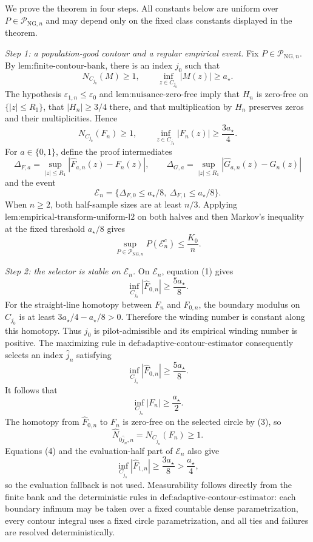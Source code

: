 We prove the theorem in four steps.  All constants below are uniform over
\(P\in\mathcal P_{\mathrm{NG},n}\) and may depend only on the fixed class
constants displayed in the theorem.

\emph{Step 1: a population-good contour and a regular empirical event.}
Fix \(P\in\mathcal P_{\mathrm{NG},n}\).  By
\(\text{lem:finite-contour-bank}\), there is an index \(j_0\) such that
\[
 N_{C_{j_0}}(M)\ge1,
 \qquad
 \inf_{z\in C_{j_0}}|M(z)|\ge a_{\star}.
\]
The hypothesis \(\varepsilon_{1,n}\le\varepsilon_0\) and
\(\text{lem:nuisance-zero-free}\) imply that \(H_n\) is zero-free on
\(\{|z|\le R_1\}\), that \(|H_n|\ge3/4\) there, and that multiplication
by \(H_n\) preserves zeros and their multiplicities.  Hence
\[
 N_{C_{j_0}}(F_n)\ge1,
 \qquad
 \inf_{z\in C_{j_0}}|F_n(z)|\ge\frac{3a_{\star}}4.       \tag{1}
\]
For \(a\in\{0,1\}\), define the proof intermediates
\[
 \Delta_{F,a}=\sup_{|z|\le R_1}
   |\widehat F_{a,n}(z)-F_n(z)|,
 \qquad
 \Delta_{G,a}=\sup_{|z|\le R_1}
   |\widehat G_{a,n}(z)-G_n(z)|
\]
and the event
\[
 \mathcal E_n=
 \{\Delta_{F,0}\le a_{\star}/8,\ 
   \Delta_{F,1}\le a_{\star}/8\}.
\]
When \(n\ge2\), both half-sample sizes are at least \(n/3\).  Applying
\(\text{lem:empirical-transform-uniform-l2}\) on both halves and then
Markov's inequality at the fixed threshold \(a_{\star}/8\) gives
\[
 \sup_{P\in\mathcal P_{\mathrm{NG},n}}P(\mathcal E_n^c)
 \le \frac{K_0}{n}.                                    \tag{2}
\]

\emph{Step 2: the selector is stable on \(\mathcal E_n\).}
On \(\mathcal E_n\), equation (1) gives
\[
 \inf_{C_{j_0}}|\widehat F_{0,n}|
 \ge\frac{5a_{\star}}8.
\]
For the straight-line homotopy between \(F_n\) and
\(\widehat F_{0,n}\), the boundary modulus on \(C_{j_0}\) is at least
\(3a_{\star}/4-a_{\star}/8>0\).  Therefore the winding number is
constant along this homotopy.  Thus \(j_0\) is pilot-admissible and its
empirical winding number is positive.  The maximizing rule in
\(\text{def:adaptive-contour-estimator}\) consequently selects an index
\(\widehat j_n\) satisfying
\[
 \inf_{C_{\widehat j_n}}|\widehat F_{0,n}|
 \ge\frac{5a_{\star}}8.                                 \tag{3}
\]
It follows that
\[
 \inf_{C_{\widehat j_n}}|F_n|
 \ge\frac{a_{\star}}2.                                  \tag{4}
\]
The homotopy from \(\widehat F_{0,n}\) to \(F_n\) is zero-free on the
selected circle by (3), so
\[
 \widehat N_{0\widehat j_n,n}
 =N_{C_{\widehat j_n}}(F_n)\ge1.                        \tag{5}
\]
Equations (4) and the evaluation-half part of \(\mathcal E_n\) also give
\[
 \inf_{C_{\widehat j_n}}|\widehat F_{1,n}|
 \ge\frac{3a_{\star}}8>\frac{a_{\star}}4,              \tag{6}
\]
so the evaluation fallback is not used.  Measurability follows directly
from the finite bank and the deterministic rules in
\(\text{def:adaptive-contour-estimator}\): each boundary infimum may be
taken over a fixed countable dense parametrization, every contour integral
uses a fixed circle parametrization, and all ties and failures are resolved
deterministically.

